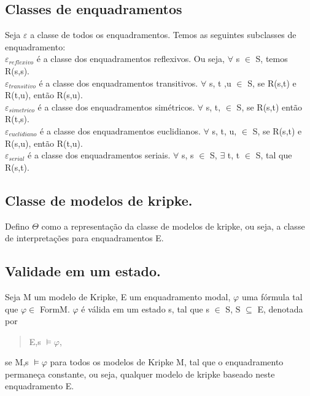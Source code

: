 \documentclass[12pt]{report}
\begin{document}
 \subsection{Classes de enquadramentos}%
 \hspace{0.5cm} Seja $\varepsilon$ a classe de todos os enquadramentos. Temos as seguintes subclasses de enquadramento:\\
 $\varepsilon _{reflexivo}$ é a classe dos enquadramentos reflexivos. Ou seja, $\forall$ s $\in$ S, temos R(s,s).\\
 $\varepsilon _{transitivo}$ é a classe dos enquadramentos transitivos. $\forall$ s, t ,u $\in$ S, se  R(s,t) e R(t,u), então R(s,u).\\
 $\varepsilon _{simetrico}$ é a classe dos enquadramentos simétricos. $\forall$ s, t, $\in$ S, se  R(s,t) então R(t,s).\\
 $\varepsilon _{euclidiano}$ é a classe dos enquadramentos euclidianos. $\forall$ s, t, u, $\in$ S, se  R(s,t) e R(s,u), então R(t,u).\\
 $\varepsilon _{serial}$ é a classe dos enquadramentos seriais. $\forall$ s, s $\in$ S, $\exists$ t, t $\in$ S, tal que R(s,t).\\
\subsection{Classe de modelos de kripke.}
 \hspace{0.5cm} Defino $\Theta$ como a representação da classe de modelos de kripke, ou seja, a classe de interpretações para enquadramentos E.

 \subsection{Validade em um estado.}%
 \hspace{0.5cm} Seja M um modelo de Kripke, E um enquadramento modal, $\varphi$ uma fórmula tal que $\varphi \in$ FormM. $\varphi$ é válida em um estado s, tal que s $\in$ S, S $\subseteq$ E, denotada por 
 \begin{quote}
 E,s $\models \varphi$,
 \end{quote}
 se M,s $\models \varphi$ para todos os modelos de Kripke M, tal que o enquadramento permaneça constante, ou seja, qualquer modelo de kripke baseado neste enquadramento E.
\end{document}
